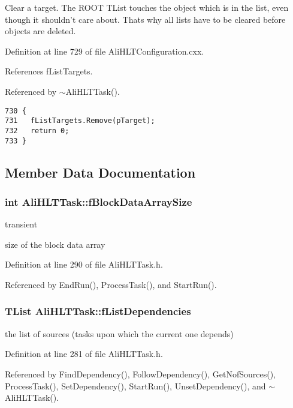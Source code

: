 Clear a target. The ROOT TList touches the object which is in the list, even though it shouldn't care about. Thats why all lists have to be cleared before objects are deleted. 

Definition at line 729 of file Ali\-HLTConfiguration.cxx.

References f\-List\-Targets.

Referenced by $\sim$Ali\-HLTTask().

\footnotesize\begin{verbatim}730 {
731   fListTargets.Remove(pTarget);
732   return 0;
733 }
\end{verbatim}\normalsize 




\subsection{Member Data Documentation}
\subsubsection{\setlength{\rightskip}{0pt plus 5cm}int {\bf Ali\-HLTTask::f\-Block\-Data\-Array\-Size}\hspace{0.3cm}{\tt  [private]}}\label{classAliHLTTask_r6}


transient 

size of the block data array 

Definition at line 290 of file Ali\-HLTTask.h.

Referenced by End\-Run(), Process\-Task(), and Start\-Run().
\subsubsection{\setlength{\rightskip}{0pt plus 5cm}TList {\bf Ali\-HLTTask::f\-List\-Dependencies}\hspace{0.3cm}{\tt  [private]}}\label{classAliHLTTask_r4}


the list of sources (tasks upon which the current one depends) 

Definition at line 281 of file Ali\-HLTTask.h.

Referenced by Find\-Dependency(), Follow\-Dependency(), Get\-Nof\-Sources(), Process\-Task(), Set\-Dependency(), Start\-Run(), Unset\-Dependency(), and $\sim$Ali\-HLTTask().
